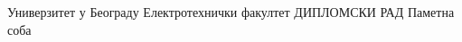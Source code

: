 \documentclass{report}
\begin{document}
\begin{center}
\Large Универзитет у Београду
\Large \break 
\Large Електротехнички факултет
\break
\break
\break
\break
\break
\break
\Large ДИПЛОМСКИ РАД
\break
\break
\break
\Huge Паметна соба
\end{center}
\end{document}
